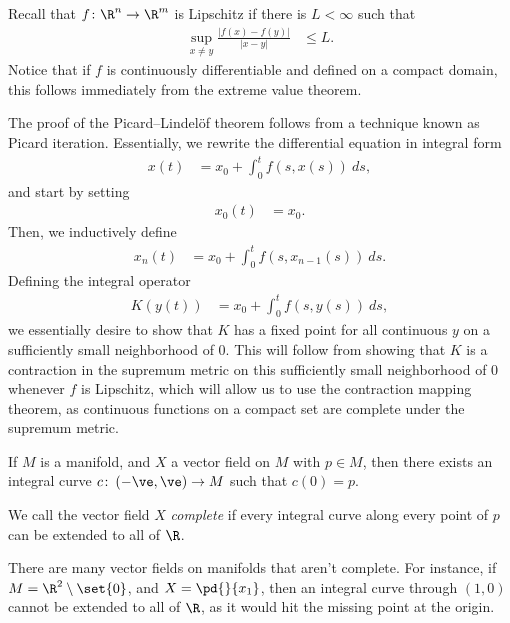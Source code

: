 \documentclass[10pt]{mypackage}
\begin{document}
Recall that $f\colon \R^{n}\rightarrow \R^{m}$ is Lipschitz if there is $L < \infty$ such that
\begin{align*}
  \sup_{x\neq y} \frac{\left\vert f\left( x \right) - f\left( y \right) \right\vert}{\left\vert x-y \right\vert } &\leq L.
\end{align*}
Notice that if $f$ is continuously differentiable and defined on a compact domain, this follows immediately from the extreme value theorem.\newline

The proof of the Picard--Lindelöf theorem follows from a technique known as Picard iteration. Essentially, we rewrite the differential equation in integral form
\begin{align*}
  x(t) &= x_0 + \int_{0}^{t} f\left( s,x(s) \right)\:ds,
\end{align*}
and start by setting
\begin{align*}
  x_0(t) &= x_0.
\end{align*}
Then, we inductively define
\begin{align*}
  x_n(t) &= x_0 + \int_{0}^{t} f\left( s,x_{n-1}(s) \right)\:ds.
\end{align*}
Defining the integral operator
\begin{align*}
  K\left(y(t)\right) &= x_0 + \int_{0}^{t} f\left( s,y(s) \right)\:ds,
\end{align*}
we essentially desire to show that $K$ has a fixed point for all continuous $y$ on a sufficiently small neighborhood of $0$. This will follow from showing that $K$ is a contraction in the supremum metric on this sufficiently small neighborhood of $0$ whenever $f$ is Lipschitz, which will allow us to use the contraction mapping theorem, as continuous functions on a compact set are complete under the supremum metric.
\begin{corollary}
  If $M$ is a manifold, and $X$ a vector field on $M$ with $p\in M$, then there exists an integral curve $c\colon \left( -\ve,\ve \right)\rightarrow M$ such that $c(0) = p$.
\end{corollary}
\begin{definition}
  We call the vector field $X$ \textit{complete} if every integral curve along every point of $p$ can be extended to all of $\R$.
\end{definition}
There are many vector fields on manifolds that aren't complete. For instance, if $M = \R^{2}\setminus \set{0}$, and $X = \pd{}{x_1}$, then an integral curve through $\left( 1,0 \right)$ cannot be extended to all of $\R$, as it would hit the missing point at the origin.
\end{document}
